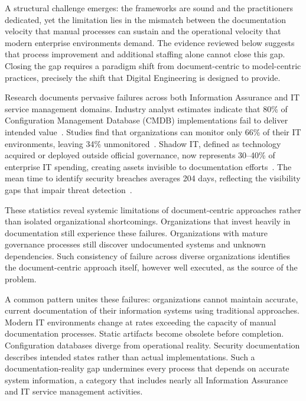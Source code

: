 A structural challenge emerges: the frameworks are sound and the practitioners dedicated, yet the limitation lies in the mismatch between the documentation velocity that manual processes can sustain and the operational velocity that modern enterprise environments demand. The evidence reviewed below suggests that process improvement and additional staffing alone cannot close this gap. Closing the gap requires a paradigm shift from document-centric to model-centric practices, precisely the shift that Digital Engineering is designed to provide.

Research documents pervasive failures across both Information Assurance and IT service management domains. Industry analyst estimates indicate that 80\% of Configuration Management Database (CMDB) implementations fail to deliver intended value~\parencite{Gartner_CMDB_2019}. Studies find that organizations can monitor only 66\% of their IT environments, leaving 34\% unmonitored~\parencite{IDC_Exabeam_2023}. Shadow IT, defined as technology acquired or deployed outside official governance, now represents 30--40\% of enterprise IT spending, creating assets invisible to documentation efforts~\parencite{Gartner_Shadow_IT_2022}. The mean time to identify security breaches averages 204 days, reflecting the visibility gaps that impair threat detection~\parencite{IBM_Ponemon_2024}.

These statistics reveal systemic limitations of document-centric approaches rather than isolated organizational shortcomings. Organizations that invest heavily in documentation still experience these failures. Organizations with mature governance processes still discover undocumented systems and unknown dependencies. Such consistency of failure across diverse organizations identifies the document-centric approach itself, however well executed, as the source of the problem.

A common pattern unites these failures: organizations cannot maintain accurate, current documentation of their information systems using traditional approaches. Modern IT environments change at rates exceeding the capacity of manual documentation processes. Static artifacts become obsolete before completion. Configuration databases diverge from operational reality. Security documentation describes intended states rather than actual implementations. Such a documentation-reality gap undermines every process that depends on accurate system information, a category that includes nearly all Information Assurance and IT service management activities.

